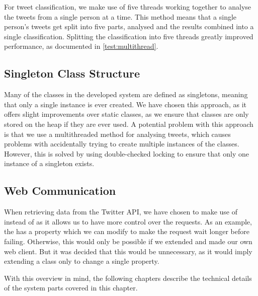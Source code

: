 For tweet classification, we make use of five threads working together to
analyse the tweets from a single person at a time. This method means that a
single person's tweets get split into five parts, analysed and the results
combined into a single classification. Splitting the classification into five
threads greatly improved performance, as documented in
\autoref{test:multithread}.

\subsection{Singleton Class Structure}
Many of the classes in the developed system are defined as singletons, meaning
that only a single instance is ever created. We have chosen this approach, as it
offers slight improvements over static classes, as we ensure that classes are
only stored on the heap if they are ever used. A potential problem with this
approach is that we use a multithreaded method for analysing tweets, which
causes problems with accidentally trying to create multiple instances of the
classes. However, this is solved by using double-checked locking to ensure that
only one instance of a singleton exists. 

\subsection{Web Communication}
When retrieving data from the Twitter API, we have chosen to make use of
\\ instead of  as it allows us to have
more control over the requests. As an example, the  has a
 property which we can modify to make the request wait longer
before failing. Otherwise, this would only be possible if we extended
 and made our own web client. But it was decided that this
would be unnecessary, as it would imply extending a class only to change a
single property.\nl


With this overview in mind, the following chapters describe
the technical details of the system parts covered in this chapter.

















